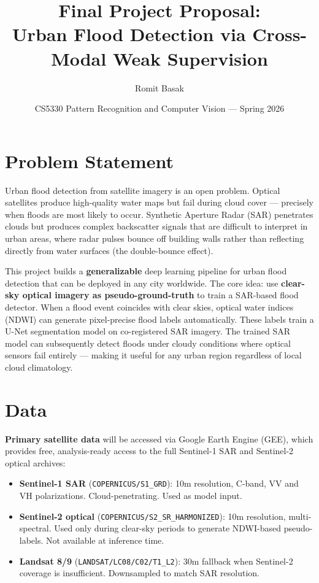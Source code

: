 \documentclass[11pt]{article}
\title{\textbf{Final Project Proposal:\\
Urban Flood Detection via Cross-Modal Weak Supervision}}
\author{Romit Basak}
\date{CS5330 Pattern Recognition and Computer Vision --- Spring 2026}
\begin{document}
\maketitle

\section*{Problem Statement}

Urban flood detection from satellite imagery is an open problem. Optical satellites
produce high-quality water maps but fail during cloud cover --- precisely when floods
are most likely to occur. Synthetic Aperture Radar (SAR) penetrates clouds but produces
complex backscatter signals that are difficult to interpret in urban areas, where radar
pulses bounce off building walls rather than reflecting directly from water surfaces
(the double-bounce effect).

This project builds a \textbf{generalizable} deep learning pipeline for urban flood
detection that can be deployed in any city worldwide. The core idea: use
\textbf{clear-sky optical imagery as pseudo-ground-truth} to train a SAR-based flood
detector. When a flood event coincides with clear skies, optical water indices (NDWI)
can generate pixel-precise flood labels automatically. These labels train a U-Net
segmentation model on co-registered SAR imagery. The trained SAR model can subsequently
detect floods under cloudy conditions where optical sensors fail entirely --- making it
useful for any urban region regardless of local cloud climatology.

\section*{Data}

\textbf{Primary satellite data} will be accessed via Google Earth Engine (GEE), which
provides free, analysis-ready access to the full Sentinel-1 SAR and Sentinel-2 optical
archives:

\begin{itemize}[noitemsep]
    \item \textbf{Sentinel-1 SAR} (\texttt{COPERNICUS/S1\_GRD}): 10m resolution,
    C-band, VV and VH polarizations. Cloud-penetrating. Used as model input.
    \item \textbf{Sentinel-2 optical} (\texttt{COPERNICUS/S2\_SR\_HARMONIZED}):
    10m resolution, multi-spectral. Used only during clear-sky periods to generate
    NDWI-based pseudo-labels. Not available at inference time.
    \item \textbf{Landsat 8/9} (\texttt{LANDSAT/LC08/C02/T1\_L2}): 30m fallback
    when Sentinel-2 coverage is insufficient. Downsampled to match SAR resolution.
\end{itemize}
\end{document}

